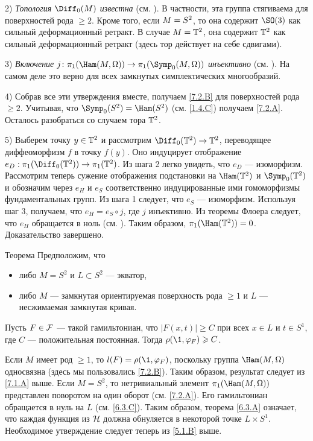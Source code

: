 2) \textit{Топология $\Diff_0 (M)$ известна} (см. \cite{EE}).
В частности, эта группа стягиваема для поверхностей рода $\ge 2$.
Кроме того, если $M \z= S^2$, то она содержит $\SO (3)$ как сильный
деформационный ретракт. 
В случае $M = \mathbb{T}^2$, она содержит $\mathbb{T}^2$ как сильный деформационный
ретракт (здесь тор действует на себе сдвигами). 

3) \textit{Включение $j\: \pi_1 (\Ham (M, \Omega)) \to \pi_1 (\Symp_0 (M,
\Omega))$ инъективно} (см. \cite[10.18 iii]{MS}). 
На самом деле это верно для всех замкнутых симплектических многообразий.

4) Собрав все эти утверждения вместе, получаем \ref{7.2.B} для
поверхностей рода $\ge 2$. 
Учитывая, что $\Symp_0 (S^2) = \Ham (S^2)$ (см. \ref{1.4.C}) получаем
\ref{7.2.A}. 
Осталось разобраться со случаем тора $\mathbb{T}^2$.

5) Выберем точку $y \in \mathbb{T}^2$ и рассмотрим  $\Diff_0 (\TT^2) \to \TT^2$,
переводящее диффеоморфизм $f$ в точку $f(y)$. 
Оно индуцирует отображение $e_D: \pi_1 (\Diff_0 (\TT^2)) \to \pi_1 (\TT^2)$.
Из шага 2 легко увидеть, что $e_D$ --- изоморфизм.
Рассмотрим теперь сужение отображения подстановки на $\Ham (\TT^2)$ и
$\Symp_0 (\TT^2)$ и обозначим через $e_H$ и $e_S$ соответственно
индуцированные ими гомоморфизмы фундаментальных групп. 
Из шага 1 следует, что $e_S$ --- изоморфизм.
Используя шаг 3, получаем, что $e_H = e_S \circ j$, где $j$ инъективно.
Из теоремы Флоера следует, что $e_H$ обращается в ноль (см. \cite{LMP1}).
Таким образом, $\pi_1 (\Ham (\TT^2)) = 0$. 
Доказательство завершено. 
\qeds

\begin{thm}[(\cite{P5})]{Теорема}\label{7.2.C}
Предположим, что 
\begin{itemize}
\item либо $M = S^2$ и $L \subset S^2$ --- экватор, 
\item либо $M$ --- замкнутая ориентируемая поверхность рода $\ge 1$ и $L$ --- несжимаемая замкнутая кривая.
\end{itemize}
Пусть $F \in \mathcal{F}$ --- такой гамильтониан, что $|F(x,t)| \ge C$ при всех $x \in L$ и $t \in S^1$, где $C$ --- положительная постоянная.
Тогда $\rho (\1, \phi_F) \z\ge C$.
\end{thm}

Если $M$ имеет род $\ge 1$, то $l (F) = \rho (\1, \phi_F)$, поскольку группа $\Ham (M, \Omega)$ односвязна (здесь мы пользовались \ref{7.2.B}).
Таким образом, результат следует из \ref{7.1.A} выше.
Если $M = S^2$, то нетривиальный элемент $\pi_1 (\Ham (M, \Omega))$ представлен поворотом на один оборот (см. \ref{7.2.A}).
Его гамильтониан обращается в нуль на $L$ (см. \ref{6.3.C}).
Таким образом, теорема \ref{6.3.A} означает, что каждая функция из $\mathcal{H}$ должна обнуляется в некоторой точке $L \times S^1$.
Необходимое утверждение следует теперь из \ref{5.1.B} выше.
\qeds

